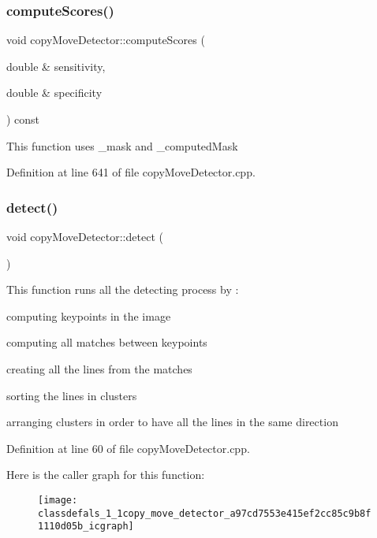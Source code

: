 \subsubsection{\texorpdfstring{compute\+Scores()}{computeScores()}}
{\footnotesize\ttfamily void copy\+Move\+Detector\+::compute\+Scores (\begin{DoxyParamCaption}\item[{double \&}]{sensitivity,  }\item[{double \&}]{specificity }\end{DoxyParamCaption}) const\hspace{0.3cm}{\ttfamily [private]}}

This function uses \+\_\+mask and \+\_\+computed\+Mask 

Definition at line 641 of file copy\+Move\+Detector.\+cpp.

\mbox{\label{classdefals_1_1copy_move_detector_a97cd7553e415ef2cc85c9b8f1110d05b}} 
\subsubsection{\texorpdfstring{detect()}{detect()}}
{\footnotesize\ttfamily void copy\+Move\+Detector\+::detect (\begin{DoxyParamCaption}{ }\end{DoxyParamCaption})}

This function runs all the detecting process by \+:
\begin{DoxyItemize}
\item computing keypoints in the image
\item computing all matches between keypoints
\item creating all the lines from the matches
\item sorting the lines in clusters
\item arranging clusters in order to have all the lines in the same direction 
\end{DoxyItemize}

Definition at line 60 of file copy\+Move\+Detector.\+cpp.

Here is the caller graph for this function\+:\nopagebreak
\begin{figure}[H]
\begin{center}
\leavevmode
\texttt{[image: classdefals\_1\_1copy\_move\_detector\_a97cd7553e415ef2cc85c9b8f1110d05b\_icgraph]}
\end{center}
\end{figure}
\mbox{\label{classdefals_1_1copy_move_detector_aba417dff2b877dacc4481b5bfd3786ed}} 
